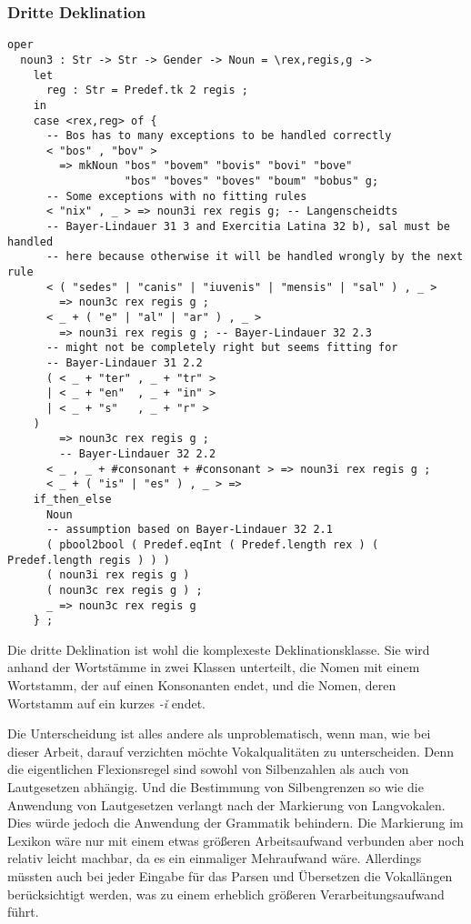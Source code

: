 \subsubsection{Dritte Deklination}
\begin{lstlisting}[float=h!tp,caption={Funktion zur Zuordnung von Nomen zu den Stämmen der dritten Deklination},label={GF-Morpho-Noun3},basicstyle=\small]
oper
  noun3 : Str -> Str -> Gender -> Noun = \rex,regis,g ->
    let
      reg : Str = Predef.tk 2 regis ;
    in
    case <rex,reg> of {
      -- Bos has to many exceptions to be handled correctly
      < "bos" , "bov" > 
        => mkNoun "bos" "bovem" "bovis" "bovi" "bove" 
                  "bos" "boves" "boves" "boum" "bobus" g;
      -- Some exceptions with no fitting rules
      < "nix" , _ > => noun3i rex regis g; -- Langenscheidts
      -- Bayer-Lindauer 31 3 and Exercitia Latina 32 b), sal must be handled 
      -- here because otherwise it will be handled wrongly by the next rule 
      < ( "sedes" | "canis" | "iuvenis" | "mensis" | "sal" ) , _ > 
        => noun3c rex regis g ;  
      < _ + ( "e" | "al" | "ar" ) , _ > 
        => noun3i rex regis g ; -- Bayer-Lindauer 32 2.3
      -- might not be completely right but seems fitting for 
      -- Bayer-Lindauer 31 2.2 
      ( < _ + "ter" , _ + "tr" >
      | < _ + "en"  , _ + "in" >
      | < _ + "s"   , _ + "r" > 
	) 
        => noun3c rex regis g ; 
        -- Bayer-Lindauer 32 2.2
      < _ , _ + #consonant + #consonant > => noun3i rex regis g ; 
      < _ + ( "is" | "es" ) , _ > => 
	if_then_else 
	  Noun 
	  -- assumption based on Bayer-Lindauer 32 2.1
	  ( pbool2bool ( Predef.eqInt ( Predef.length rex ) ( Predef.length regis ) ) ) 
	  ( noun3i rex regis g ) 
	  ( noun3c rex regis g ) ;
      _ => noun3c rex regis g
    } ;
\end{lstlisting}
Die dritte Deklination ist wohl die komplexeste Deklinationsklasse. Sie wird anhand der Wortstämme in zwei Klassen unterteilt, die Nomen mit einem Wortstamm, der auf einen Konsonanten endet, und die Nomen, deren Wortstamm auf ein kurzes \textit{-ǐ} endet. \par
Die Unterscheidung ist alles andere als unproblematisch, wenn man, wie bei dieser Arbeit, darauf verzichten möchte Vokalqualitäten zu unterscheiden. Denn die eigentlichen Flexionsregel sind sowohl von Silbenzahlen als auch von Lautgesetzen abhängig. Und die Bestimmung von Silbengrenzen so wie die Anwendung von Lautgesetzen verlangt nach der Markierung von Langvokalen. Dies würde jedoch die Anwendung der Grammatik behindern. Die Markierung im Lexikon wäre nur mit einem etwas größeren Arbeitsaufwand verbunden aber noch relativ leicht machbar, da es ein einmaliger Mehraufwand wäre. Allerdings müssten auch bei jeder Eingabe für das Parsen und Übersetzen die Vokallängen berücksichtigt werden, was zu einem erheblich größeren Verarbeitungsaufwand führt. \par
